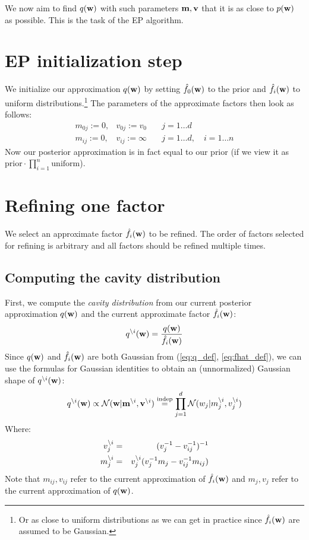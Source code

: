 \documentclass[10pt,a4paper,notitlepage]{article}
\begin{document}
We now aim to find $q(\mathbf{w})$ with such parameters $\mathbf{m}, \mathbf{v}$ that it is as close to $p(\mathbf{w})$ as possible. This is the task of the EP algorithm.

\section{EP initialization step}

We initialize our approximation $q(\mathbf{w})$ by setting $\hat{f}_0(\mathbf{w})$ to the prior and $\hat{f}_i(\mathbf{w})$ to uniform distributions.\footnote{Or as close to uniform distributions as we can get in practice since $\hat{f}_i(\mathbf{w})$ are assumed to be Gaussian.} The parameters of the approximate factors then look as follows:
\begin{eqnarray}
m_{0j} := 0, & v_{0j} := v_0  & \quad j=1\dots d \\ 
m_{ij} := 0, & v_{ij} := \infty & \quad j=1\dots d, \quad i = 1\dots n
\end{eqnarray}
Now our posterior approximation is in fact equal to our prior (if we view it as $\mbox{prior}\cdot\prod_{i=1}^n\mbox{uniform}$).

\section{Refining one factor}

We select an approximate factor $\hat{f}_i(\mathbf{w})$ to be refined. The order of factors selected for refining is arbitrary and all factors should be refined multiple times. 

\subsection{Computing the cavity distribution}

First, we compute the \emph{cavity distribution} from our current posterior approximation $q(\mathbf{w})$ and the current approximate factor $\hat{f}_i(\mathbf{w})$:
\begin{equation}
q^{\setminus i}(\mathbf{w}) = \frac{q(\mathbf{w})}{\hat{f}_i(\mathbf{w})}
\end{equation}
Since $q(\mathbf{w})$ and $\hat{f}_i(\mathbf{w})$ are both Gaussian from (\ref{eq:q_def}, \ref{eq:fhat_def}), we can use the formulas for Gaussian identities to obtain an (unnormalized) Gaussian shape of $q^{\setminus i}(\mathbf{w})$:
\begin{equation}
q^{\setminus i}(\mathbf{w}) \propto \mathcal{N}(\mathbf{w}|\mathbf{m}^{\setminus i}, \mathbf{v}^{\setminus i}) \stackrel{\mathrm{indep}}{=} \prod_{j=1}^d \mathcal{N}(w_j|m_j^{\setminus i}, v_j^{\setminus i})
\end{equation}
Where:
\begin{eqnarray}
v_j^{\setminus i} & = & (v_j^{-1} - v_{ij}^{-1})^{-1} \\
m_j^{\setminus i} & = & v_j^{\setminus i}(v_j^{-1}m_j - v_{ij}^{-1}m_{ij})
\end{eqnarray}
Note that $m_{ij},v_{ij}$ refer to the current approximation of $\hat{f}_i(\mathbf{w})$ and $m_j, v_j$ refer to the current approximation of $q(\mathbf{w})$.
\end{document}
